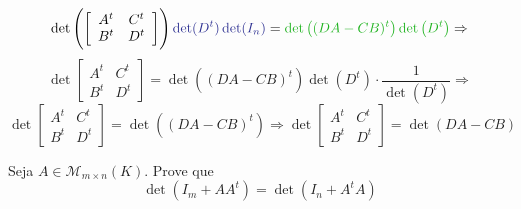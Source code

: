 \documentclass[11pt,a4paper]{article}
\begin{document}
{{\[    \]
        \[
       \det\left( \left[\begin{array}{cc} A^t & C^t \\ B^t & D^t \end{array} \right] \right) \textcolor{Blue}{\det (D^t) \det(I_n)} = \textcolor{Verde}{\det \left((DA - CB)^t \right) \det\left(D^t \right)} \Rightarrow
    \]
            \[
       \det \left[\begin{array}{cc} A^t & C^t \\ B^t & D^t \end{array} \right] = \det \left((DA - CB)^t \right) \det\left(D^t \right)\cdot \frac{1}{\det\left(D^t \right)} \Rightarrow
    \]
                \[
       \det \left[\begin{array}{cc} A^t & C^t \\ B^t & D^t \end{array} \right] = \det \left((DA - CB)^t \right) \Rightarrow \boxed{  \det \left[\begin{array}{cc} A^t & C^t \\ B^t & D^t \end{array} \right] = \det \left(DA - CB \right)}
    \]
    }
    }

 Seja $A \in \mathcal{M}_{m \times n}(K).$ Prove que
\[
\det(I_m + AA^t) = \det(I_n + A^tA)
\]
\end{document}
